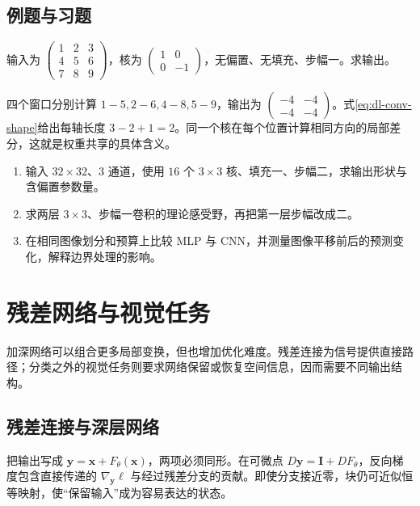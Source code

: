 \documentclass[UTF8,12pt,a4paper,fontset=fandol]{ctexbook}
\begin{document}
\section{例题与习题}
\begin{example}[边缘差分核]
输入为 $\left(\begin{smallmatrix}1&2&3\\4&5&6\\7&8&9\end{smallmatrix}\right)$，核为 $\left(\begin{smallmatrix}1&0\\0&-1\end{smallmatrix}\right)$，无偏置、无填充、步幅一。求输出。
\end{example}
\begin{solve}
四个窗口分别计算 $1-5,2-6,4-8,5-9$，输出为 $\left(\begin{smallmatrix}-4&-4\\-4&-4\end{smallmatrix}\right)$。式\eqref{eq:dl-conv-shape}给出每轴长度 $3-2+1=2$。同一个核在每个位置计算相同方向的局部差分，这就是权重共享的具体含义。
\end{solve}
\begin{enumerate}
\item 输入 $32\times32$、$3$ 通道，使用 $16$ 个 $3\times3$ 核、填充一、步幅二，求输出形状与含偏置参数量。
\item 求两层 $3\times3$、步幅一卷积的理论感受野，再把第一层步幅改成二。
\item 在相同图像划分和预算上比较 MLP 与 CNN，并测量图像平移前后的预测变化，解释边界处理的影响。
\end{enumerate}

\chapter{残差网络与视觉任务}
\label{chap:dl-vision}
加深网络可以组合更多局部变换，但也增加优化难度。残差连接为信号提供直接路径；分类之外的视觉任务则要求网络保留或恢复空间信息，因而需要不同输出结构。

\section{残差连接与深层网络}
把输出写成 $\mathbf y=\mathbf x+F_\theta(\mathbf x)$，两项必须同形。在可微点 $D\mathbf y=\mathbf I+DF_\theta$，反向梯度包含直接传递的 $\nabla_{\mathbf y}\ell$ 与经过残差分支的贡献。即使分支接近零，块仍可近似恒等映射，使“保留输入”成为容易表达的状态。
\end{document}
